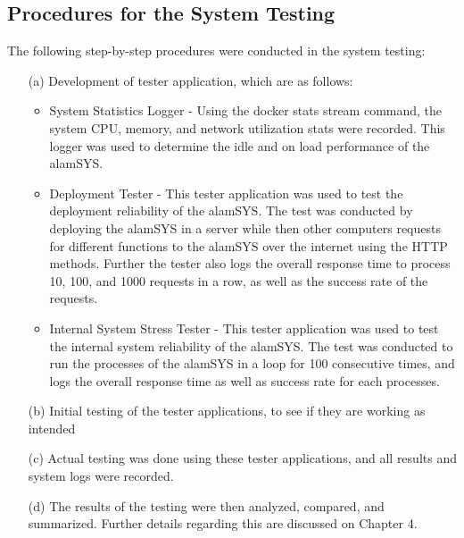 \subsection{Procedures for the System Testing}
\label{subsec:proc_mobdev}
The following step-by-step procedures were conducted in the system testing:
\begin{itemize}
    \item[(a)] Development of tester application, which are as follows:
    \begin{itemize}
        \item System Statistics Logger - Using the docker stats stream command, the system 
        CPU, memory, and network utilization stats were recorded. This logger was used
        to determine the idle and on load performance of the alamSYS.
        \item Deployment Tester - This tester application was used to test the deployment
        reliability of the alamSYS. The test was conducted by deploying the alamSYS in a server
        while then other computers requests for different functions to the alamSYS over the internet
        using the HTTP methods. Further the tester also logs the overall response time to
        process 10, 100, and 1000 requests in a row, as well as the success rate of the
        requests.
        \item Internal System Stress Tester - This tester application was used to test the
        internal system reliability of the alamSYS. The test was conducted to run the processes
        of the alamSYS in a loop for 100 consecutive times, and logs the overall response time
        as well as success rate for each processes.
    \end{itemize}
    \item[(b)] Initial testing of the tester applications, to see if
    they are working as intended
    \item[(c)] Actual testing was done using these tester applications, and
    all results and system logs were recorded.
    \item[(d)] The results of the testing were then analyzed, compared, and summarized.
    Further details regarding this are discussed on Chapter 4.
\end{itemize}
\hfill \\